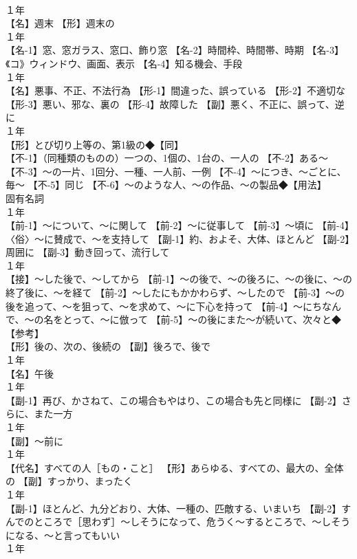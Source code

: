 \documentclass[8pt]{extreport}
\begin{document}
\begin{CJK}{UTF8}{min}
\\	１年	
\\	【名】週末 【形】週末の
\\	１年	
\\	【名-1】窓、窓ガラス、窓口、飾り窓 【名-2】時間枠、時間帯、時期 【名-3】《コ》ウィンドウ、画面、表示 【名-4】知る機会、手段
\\	１年	
\\	【名】悪事、不正、不法行為 【形-1】間違った、誤っている 【形-2】不適切な 【形-3】悪い、邪な、裏の 【形-4】故障した 【副】悪く、不正に、誤って、逆に
\\	１年	
\\	【形】とび切り上等の、第1級の◆【同】
\\	【不-1】（同種類のものの）一つの、1個の、1台の、一人の 【不-2】ある～ 【不-3】～の一片、1回分、一種、一人前、一例 【不-4】～につき、～ごとに、毎～ 【不-5】同じ 【不-6】～のような人、～の作品、～の製品◆【用法】
\\	固有名詞
\\	１年	
\\	【前-1】～について、～に関して 【前-2】～に従事して 【前-3】～頃に 【前-4】〈俗〉～に賛成で、～を支持して 【副-1】約、およそ、大体、ほとんど 【副-2】周囲に 【副-3】動き回って、流行して
\\	１年	
\\	【接】～した後で、～してから 【前-1】～の後で、～の後ろに、～の後に、～の終了後に、～を経て 【前-2】～したにもかかわらず、～したので 【前-3】～の後を追って、～を狙って、～を求めて、～に下心を持って 【前-4】～にちなんで、～の名をとって、～に倣って 【前-5】～の後にまた～が続いて、次々と◆【参考】
\\	【形】後の、次の、後続の 【副】後ろで、後で
\\	１年	
\\	【名】午後
\\	１年	
\\	【副-1】再び、かさねて、この場合もやはり、この場合も先と同様に 【副-2】さらに、また一方
\\	１年	
\\	【副】～前に
\\	１年	
\\	【代名】すべての人［もの・こと］ 【形】あらゆる、すべての、最大の、全体の 【副】すっかり、まったく
\\	１年	
\\	【副-1】ほとんど、九分どおり、大体、一種の、匹敵する、いまいち 【副-2】すんでのところで［思わず］～しそうになって、危うく～するところで、～しそうになる、～と言ってもいい
\\	１年	

\end{CJK}
\end{document}
